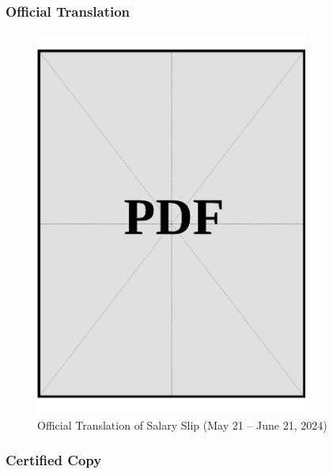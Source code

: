 \subsubsection*{Official Translation}
\vspace*{\fill}
\begin{figure}[h]
    \centering
    \includegraphics[page=1, width=0.8\textwidth]{../docs/applicant/funds/salary-slips/month-1/official-translations.pdf}
    \caption{Official Translation of Salary Slip (May 21 – June 21, 2024)}
    \label{fig:month-1-trans}
\end{figure}
\vspace*{\fill}

\clearpage

\subsubsection*{Certified Copy}
\vspace*{\fill}

